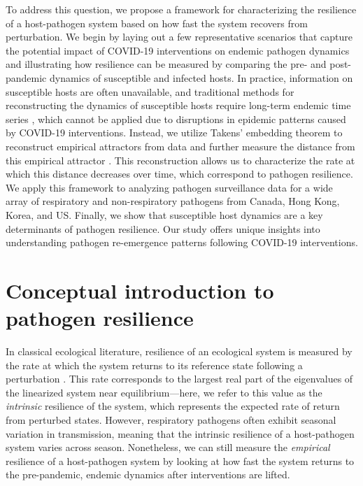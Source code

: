 \documentclass[12pt]{article}
\newcommand{\comment}{\showcomment}
\newcommand{\showcomment}[3]{\textcolor{#1}{\textbf{[#2: }\textsl{#3}\textbf{]}}}
\newcommand{\swp}[1]{\comment{magenta}{SWP}{#1}}
\begin{document}
To address this question, we propose a framework for characterizing the resilience of a host-pathogen system based on how fast the system recovers from perturbation.
We begin by laying out a few representative scenarios that capture the potential impact of COVID-19 interventions on endemic pathogen dynamics and illustrating how resilience can be measured by comparing the pre- and post-pandemic dynamics of susceptible and infected hosts.
In practice, information on susceptible hosts are often unavailable, and traditional methods for reconstructing the dynamics of susceptible hosts require long-term endemic time series \citep{bobashev2000reconstructing,finkenstadt2000time}, which cannot be applied due to disruptions in epidemic patterns caused by COVID-19 interventions.
Instead, we utilize Takens' embedding theorem to reconstruct empirical attractors from data and further measure the distance from this empirical attractor \citep{takens2006detecting}.
This reconstruction allows us to characterize the rate at which this distance decreases over time, which correspond to pathogen resilience.
We apply this framework to analyzing pathogen surveillance data for a wide array of respiratory and non-respiratory pathogens from Canada, Hong Kong, Korea, and US.
Finally, we show that susceptible host dynamics are a key determinants of pathogen resilience.
Our study offers unique insights into understanding pathogen re-emergence patterns following COVID-19 interventions.
 
\section*{Conceptual introduction to pathogen resilience}

In classical ecological literature, resilience of an ecological system is measured by the rate at which the system returns to its reference state following a perturbation \citep{pimm1979structure, neubert1997alternatives,gunderson2000ecological,dakos2022ecological}.
This rate corresponds to the largest real part of the eigenvalues of the linearized system near equilibrium---here, we refer to this value as the \emph{intrinsic} resilience of the system, which represents the expected rate of return from perturbed states.
However, respiratory pathogens often exhibit seasonal variation in transmission, meaning that the intrinsic resilience of a host-pathogen system varies across season.
Nonetheless, we can still measure the \emph{empirical} resilience of a host-pathogen system by looking at how fast the system returns to the pre-pandemic, endemic dynamics after interventions are lifted.
\end{document}

